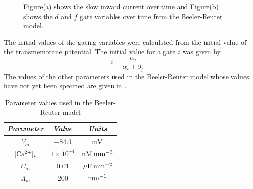 \begin{figure}[hbtp]
\begin{subfigure}[b]{0.45\linewidth}
    \caption{}
  \end{subfigure}
  \caption[Beeler-Reuter slow inward current]{Figure(a) shows the
    slow inward current over time and Figure(b) shows the
    $d$ and $f$ gate variables over time from the Beeler-Reuter model.}
  \label{fig:BR_Is_traces}
\end{figure}
%
The initial values of the gating variables were calculated from the initial
value of the transmembrane potential. The initial value for a gate $i$ was
given by
\begin{equation}
  i=\dfrac{\alpha_i}{\alpha_i+\beta_i}
\end{equation}
The values of the other parameters used in the Beeler-Reuter model whose
values have not yet been specified are given in .
\begin{table}[hbtp] \centering
  \begin{tabular}{|c|c|c|}
    \hline
    \emph{Parameter} & \emph{Value} & \emph{Units}  \\ 
    \hline
    \hline 
    $V_m$  & $-84.0$ & $\mathrm{mV}$\\
    $ [\mathrm{Ca^{2+}}]_{i} $  & $1\times 10^{-4}$ & $\mathrm{nM}\thickspace\mathrm{mm}^{-3}$\\
    $C_m$  & $0.01$ & $\mathrm{\mu F}\thickspace\mathrm{mm}^{-2}$\\
    $A_m$ & $200$ & $\mathrm{mm}^{-1}$ \\
    \hline
  \end{tabular}
  \caption[Parameter values used in the Beeler-Reuter model]{Parameter values
    used in the Beeler-Reuter model}
  \label{tab:BR_Model_Params}
\end{table}
%
